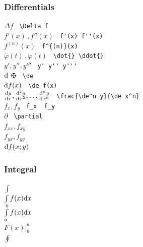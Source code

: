 \subsubsection{Differentials}
\begin{tabbing}
\mySymbols
 $\Delta f $            \>                     \> \verb` \Delta f  `  \\
 $f'(x)\, , f''(x) $    \>                     \> \verb` f'(x) f''(x) `  \\
 $f^{(n)}(x) $          \>                     \> \verb` f^{(n)}(x)  `  \\
 $\dot{\varphi}(t)\, ,\ddot{\varphi}(t)$
                        \>                     \> \verb` \dot{} \ddot{}`  \\
 $y',y'',y''' $         \>                     \> \verb` y' y'' y''' `  \\
 $ \mathrm{d} $                 \>                     \> $\maltese$ \verb` \de ` \\
 $\mathrm{d} f(x) $             \>                     \> \verb` \de f(x)  `  \\
 $\frac{\mathrm{d} y}{\mathrm{d} x},\frac{\mathrm{d}^2 y}{\mathrm{d} x^2},\dots \frac{\mathrm{d}^n y}{\mathrm{d} x^n} $ 
                        \>                     \> \verb` \frac{\de^n y}{\de x^n}  `  \\
 $f_x , f_y$            \>                     \> \verb` f_x  f_y  `  \\
 $\partial $            \>                     \> \verb` \partial  `  \\
 $f_{xx} , f_{xy} $     \>                     \> \verb`   `  \\
 $f_{yx} , f_{yy} $     \>                     \> \verb`   `  \\
 $\mathrm{d} f(x;y) $           \>                     \> \verb`   `  \\
\end{tabbing}

\subsubsection{Integral}
\begin{tabbing}
\mySymbols
 $\int $                \>                     \> \verb`   `  \\
 $\int f(x) \mathrm{d} x $      \>                     \> \verb`   `  \\
 $\int\limits^b_a f(x) \mathrm{d} x $
                        \>                     \> \verb`   `  \\
 $F(x)\big|^a_b $       \>                     \> \verb`   `  \\
 $\oint $               \>                     \> \verb`   `  \\
\end{tabbing}

